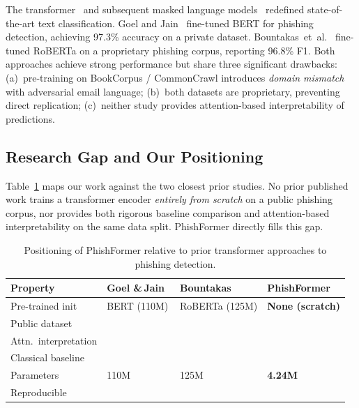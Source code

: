 \documentclass[sigconf, nonacm]{acmart}
\newcommand{\cmark}{\ding{51}}
\newcommand{\xmark}{\ding{55}}
\begin{document}
The transformer~\cite{vaswani2017} and subsequent masked language
models~\cite{devlin2019} redefined state-of-the-art text
classification.
Goel and Jain~\cite{goel2021} fine-tuned BERT for phishing detection,
achieving 97.3\% accuracy on a private dataset.
Bountakas~et~al.~\cite{bountakas2023} fine-tuned RoBERTa on a
proprietary phishing corpus, reporting 96.8\% F1.
Both approaches achieve strong performance but share three significant
drawbacks: (a)~pre-training on BookCorpus / CommonCrawl introduces
\emph{domain mismatch} with adversarial email language;
(b)~both datasets are proprietary, preventing direct replication;
(c)~neither study provides attention-based interpretability of
predictions.

\subsection{Research Gap and Our Positioning}

Table~\ref{tab:diff} maps our work against the two closest prior
studies.
No prior published work trains a transformer encoder
\emph{entirely from scratch} on a public phishing corpus, nor provides
both rigorous baseline comparison and attention-based interpretability
on the same data split.
PhishFormer directly fills this gap.

\begin{table}[h]
\centering\small
\caption{Positioning of PhishFormer relative to prior transformer
  approaches to phishing detection.}
\label{tab:diff}
\begin{tabular}{@{}lp{1.5cm}p{1.6cm}p{1.5cm}@{}}
\toprule
\textbf{Property}
  & \textbf{Goel \&\,Jain~\cite{goel2021}}
  & \textbf{Bountakas~\cite{bountakas2023}}
  & \textbf{PhishFormer} \\
\midrule
Pre-trained init     & BERT (110M)   & RoBERTa (125M) & \textbf{None (scratch)} \\
Public dataset       & \xmark        & \xmark         & \cmark \\
Attn.\ interpretation& \xmark        & \xmark         & \cmark \\
Classical baseline   & \xmark        & \xmark         & \cmark \\
Parameters           & 110M          & 125M           & \textbf{4.24M} \\
Reproducible         & \xmark        & \xmark         & \cmark \\
\bottomrule
\end{tabular}
\end{table}
\end{document}
